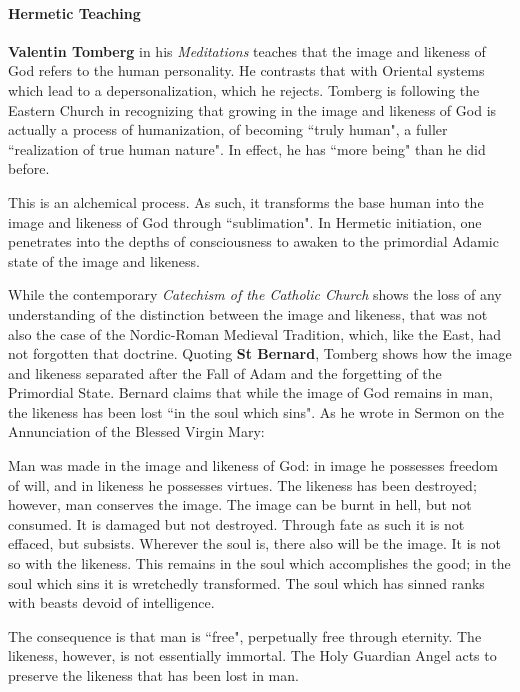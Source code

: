 \paragraph{Hermetic Teaching}
\textbf{Valentin Tomberg} in his \emph{Meditations} teaches that the image and likeness of God refers to the human personality. He contrasts that with Oriental systems which lead to a depersonalization, which he rejects. Tomberg is following the Eastern Church in recognizing that growing in the image and likeness of God is actually a process of humanization, of becoming ``truly human", a fuller ``realization of true human nature". In effect, he has ``more being" than he did before.

This is an alchemical process. As such, it transforms the base human into the image and likeness of God through ``sublimation". In Hermetic initiation, one penetrates into the depths of consciousness to awaken to the primordial Adamic state of the image and likeness.

While the contemporary \emph{Catechism of the Catholic Church} shows the loss of any understanding of the distinction between the image and likeness, that was not also the case of the Nordic-Roman Medieval Tradition, which, like the East, had not forgotten that doctrine. Quoting \textbf{St Bernard}, Tomberg shows how the image and likeness separated after the Fall of Adam and the forgetting of the Primordial State. Bernard claims that while the image of God remains in man, the likeness has been lost ``in the soul which sins". As he wrote in Sermon on the Annunciation of the Blessed Virgin Mary:

\begin{quotex}
Man was made in the image and likeness of God: in image he possesses freedom of will, and in likeness he possesses virtues. The likeness has been destroyed; however, man conserves the image. The image can be burnt in hell, but not consumed. It is damaged but not destroyed. Through fate as such it is not effaced, but subsists. Wherever the soul is, there also will be the image. It is not so with the likeness. This remains in the soul which accomplishes the good; in the soul which sins it is wretchedly transformed. The soul which has sinned ranks with beasts devoid of intelligence. 

\end{quotex}
The consequence is that man is ``free", perpetually free through eternity. The likeness, however, is not essentially immortal. The Holy Guardian Angel acts to preserve the likeness that has been lost in man.

